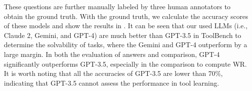 These questions are further manually labeled by three human annotators to obtain the ground truth.
With the ground truth, we calculate the accuracy scores of these models and show the results in . 
It can be seen that our used LLMs (i.e., Claude 2, Gemini, and GPT-4) are much better than GPT-3.5 in ToolBench to determine the solvability of tasks, where the Gemini and GPT-4 outperform by a large margin.
In both the evaluation of answers and comparison, GPT-4 significantly outperforms GPT-3.5, especially in the comparison to compute WR.
It is worth noting that all the accuracies of GPT-3.5 are lower than 70\%, indicating that GPT-3.5 cannot assess the performance in tool learning.







